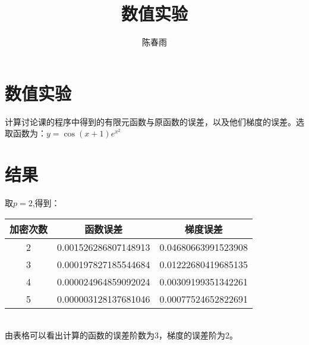 \documentclass[12pt,a4paper]{article}
\title{数值实验}
\author{陈春雨}
\date{\chntoday}
\begin{document}
\maketitle
\newpage
\section{ 数值实验}
计算讨论课的程序中得到的有限元函数与原函数的误差，以及他们梯度的误差。选取函数为：$y=\cos(x+1)e^{x^2}$\\

\section{ 结果}
取$p=2$,得到：\\
\begin{tabular}{|c|c|c|}
\hline
加密次数 & 函数误差 & 梯度误差\\
\hline
2 & 0.001526286807148913 & 0.04680663991523908\\
\hline
3 & 0.000197827185544684 & 0.01222680419685135\\
\hline
4 & 0.000024964859092024 & 0.00309199351342261\\
\hline
5 & 0.000003128137681046 & 0.00077524652822691\\
\hline
\end{tabular}\\
由表格可以看出计算的函数的误差阶数为3，梯度的误差阶为2。
\end{document}
